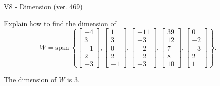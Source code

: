 \begin{exercise}
  \begin{exerciseTitle}V8 - Dimension (ver. 469)\end{exerciseTitle}
  \begin{exerciseStatement}
    Explain how to find the dimension of 
\[W=\mathrm{span}\ \left\{\left[\begin{array}{r}
-4 \\
3 \\
-1 \\
2 \\
-3
\end{array}\right] , \left[\begin{array}{r}
1 \\
3 \\
0 \\
2 \\
-1
\end{array}\right] , \left[\begin{array}{r}
-11 \\
-3 \\
-2 \\
-2 \\
-3
\end{array}\right] , \left[\begin{array}{r}
39 \\
12 \\
7 \\
8 \\
10
\end{array}\right] , \left[\begin{array}{r}
0 \\
-2 \\
-3 \\
2 \\
1
\end{array}\right]\right\}.\]



  \end{exerciseStatement}
  \begin{exerciseAnswer}
   The dimension of \(W\) is  \(3\).
  


  \end{exerciseAnswer}
\end{exercise}